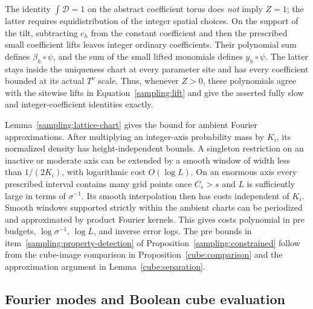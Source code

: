 The identity $\int\mathcal D=1$ on the abstract coefficient torus does
\emph{not} imply $Z=1$; the latter requires equidistribution of the integer
spatial choices.  On the support of the tilt, subtracting $c_h$ from the
constant coefficient and then the prescribed small coefficient lifts
leaves integer ordinary coefficients.  Their polynomial sum defines
$\beta_h\circ\psi$, and the sum of the small lifted monomials defines
$y_h\circ\psi$.  The latter stays inside the uniqueness chart at every
parameter site and has every coefficient bounded at its actual $T^\nu$
scale.  Thus, whenever $Z>0$, these polynomials agree with the sitewise
lifts in Equation~\eqref{sampling:lift} and give the asserted fully slow
and integer-coefficient identities exactly.

Lemma~\ref{sampling:lattice-chart} gives the bound for ambient
Fourier approximations.  After multiplying an integer-axis probability mass
by $K_i$, its normalized density has height-independent bounds.  A singleton
restriction on an inactive or moderate axis can be extended by a smooth
window of width less than $1/(2K_i)$, with logarithmic cost $O(\log L)$.
On an enormous axis every prescribed interval contains many grid points
once $C_s>s$ and $L$ is sufficiently large in terms of $\sigma^{-1}$.
Its smooth interpolation then has costs independent of $K_i$.  Smooth
windows supported strictly within the ambient charts can be periodized and
approximated by product Fourier kernels.  This gives costs polynomial in
pre budgets, $\log\sigma^{-1}$, $\log L$, and inverse error logs.
The pre bounds in item~\ref{sampling:property-detection} of
Proposition~\ref{sampling:constrained} follow from the cube-image comparison
in Proposition~\ref{cube:comparison} and the approximation argument in
Lemma~\ref{cube:separation}.

\subsection{Fourier modes and Boolean cube evaluation}

